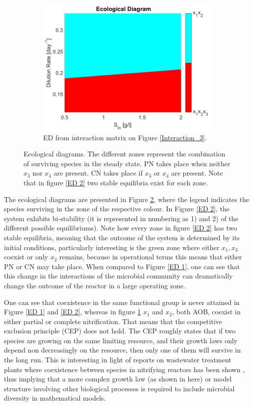 \documentclass[processes,article,submit,moreauthors,pdftex]{Definitions/mdpi}
\begin{document}
\begin{figure}[h]
\begin{subfigure}[t]{0.31\textwidth}
		\includegraphics[width=\textwidth]{Stability/ED_parameters_modified_2}
		\caption{ED from interaction matrix on Figure \ref{Interaction_3}.}
		\label{ED 3}
	\end{subfigure}
	\caption{Ecological diagrams. The different zones represent the combination of surviving species in the steady state. PN takes place when neither $x_3$ nor $x_4$ are present. CN takes place if $x_3$ or $x_4$ are present. Note that in figure \ref{ED 2} two stable equilibria exist for each zone. }
	\label{ecological_diagrams}
\end{figure}

The ecological diagrams are presented in Figure \ref{ecological_diagrams}, where the legend indicates the species surviving in the zone of the respective colour. In Figure \ref{ED 2}, the system exhibits bi-stability (it is represented in numbering as 1) and 2) of the different possible equilibriums). Note how every zone in figure \ref{ED 2} has two stable equilibria, meaning that the outcome of the system is determined by its initial conditions, particularly interesting is the green zone where either $x_1,x_3$ coexist or only $x_2$ remains, because in operational terms this means that either PN or CN may take place. When compared to Figure \ref{ED 1}, one can see that this change in the interactions of the microbial community can dramatically change the outcome of the reactor in a large operating zone. 

One can see that coexistence in the same functional group is never attained in Figure \ref{ED 1} and \ref{ED 2}, whereas in figure \ref{ED 3} $x_1$ and $x_2$, both AOB, coexist in either partial or complete nitrification. That means that the competitive exclusion principle \cite{lobry2017chemostat} (CEP) does not hold. The CEP roughly states that if two species are growing on the same limiting resource, and their growth laws only depend non decreasingly on the resource, then only one of them will survive in the long run. This is interesting in light of reports on wastewater treatment plants where coexistence between species in nitrifying reactors has been shown \cite{Wagner2002}, thus implying that a more complex growth law (as shown in here) or model structure involving other biological processes is required to include microbial diversity in mathematical models. 
\end{document}
